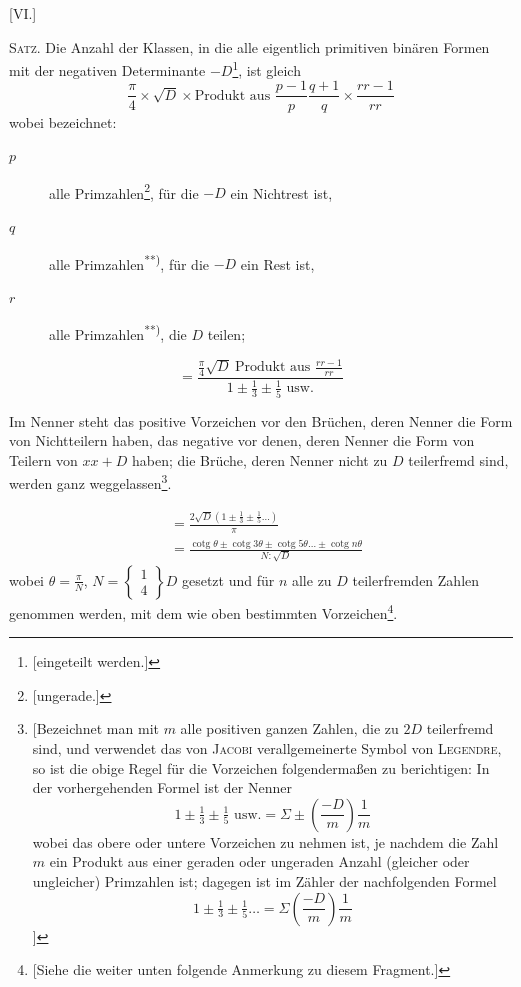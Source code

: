 \par\bigskip{}\centerline{[VI.]}\medskip
\textsc{Satz.} Die Anzahl der Klassen, in die alle eigentlich primitiven binären Formen mit der negativen Determinante $-D$\begingroup\renewcommand{\thefootnote}{*)}\footnote{[eingeteilt werden.]}\endgroup, ist gleich
\[
\frac\pi4\times\surd D\times\text{Produkt aus }\frac{p-1}p\frac{q+1}q\times\frac{rr-1}{rr}
\]
wobei bezeichnet:
\begin{description}
\item[$p$] alle Primzahlen\begingroup\renewcommand{\thefootnote}{**)}\footnote{[ungerade.]}\endgroup, für die $-D$ ein Nichtrest ist,
\item[$q$] alle Primzahlen\textsuperscript{**)}, für die $-D$ ein Rest ist,
\item[$r$] alle Primzahlen\textsuperscript{**)}, die $D$ teilen;
\end{description}
\[
=\frac{\frac\pi4\surd D\ \text{Produkt aus }\frac{rr-1}{rr}}{1\pm\tfrac13\pm\tfrac15\text{ usw.}}
\]

Im Nenner steht das positive Vorzeichen vor den Brüchen, deren Nenner die Form von Nichtteilern haben, das negative vor denen, deren Nenner die Form von Teilern von $xx+D$ haben; die Brüche, deren Nenner nicht zu $D$ teilerfremd sind, werden ganz weggelassen\begingroup\renewcommand{\thefootnote}{***)}\footnote{[Bezeichnet man mit $m$ alle positiven ganzen Zahlen, die zu $2D$ teilerfremd sind, und verwendet das von \textsc{Jacobi} verallgemeinerte Symbol von \textsc{Legendre}, so ist die obige Regel für die Vorzeichen folgendermaßen zu berichtigen: In der vorhergehenden Formel ist der Nenner
\[
1\pm\tfrac13\pm\tfrac15\text{ usw.}=\Sigma\pm\left(\frac{-D}m\right)\frac1m
\]
wobei das obere oder untere Vorzeichen zu nehmen ist, je nachdem die Zahl $m$ ein Produkt aus einer geraden oder ungeraden Anzahl (gleicher oder ungleicher) Primzahlen ist; dagegen ist im Zähler der nachfolgenden Formel
\[
1\pm\tfrac13\pm\tfrac15\ldots=\Sigma\left(\frac{-D}m\right)\frac1m
\]
]}\endgroup.

\[
\begin{aligned}
&=\frac{2\surd D(1\pm\tfrac13\pm\tfrac15\ldots)}\pi\\
&=\frac{\operatorname{cotg}\theta\pm\operatorname{cotg}3\theta\pm\operatorname{cotg}5\theta\ldots\pm\operatorname{cotg}n\theta}{N:\surd D}
\end{aligned}
\]
wobei $\theta=\frac\pi N$, $N=\left\{\begin{smallmatrix}1\\4\end{smallmatrix}\right\}D$ gesetzt und für $n$ alle zu $D$ teilerfremden Zahlen genommen werden, mit dem wie oben bestimmten Vorzeichen\begingroup\renewcommand{\thefootnote}{*)}\footnote{[Siehe die weiter unten folgende Anmerkung zu diesem Fragment.]}\endgroup.

